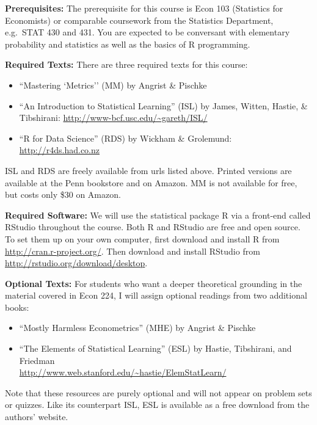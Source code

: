 \documentclass[11pt, letterpaper]{article}
\begin{document}
\medskip

\noindent \textbf{Prerequisites:} 
The prerequisite for this course is Econ 103 (Statistics for Economists) or comparable coursework from the Statistics Department, e.g.\ STAT 430 and 431. 
You are expected to be conversant with elementary probability and statistics as well as the basics of R programming.




\medskip

\noindent \textbf{Required Texts:} There are three required texts for this course:
\begin{itemize}
  \item ``Mastering `Metrics'' (MM) by Angrist \& Pischke
  \item ``An Introduction to Statistical Learning'' (ISL) by James, Witten, Hastie, \& Tibshirani: \url{http://www-bcf.usc.edu/~gareth/ISL/}
  \item ``R for Data Science'' (RDS) by Wickham \& Grolemund: \url{http://r4ds.had.co.nz}
\end{itemize}
ISL and RDS are freely available from urls listed above.
Printed versions are available at the Penn bookstore and on Amazon.
MM is not available for free, but costs only \$30 on Amazon.

\medskip


\noindent \textbf{Required Software:} 
We will use the statistical package R via a front-end called RStudio throughout the course. 
Both R and RStudio are free and open source. 
To set them up on your own computer, first download and install R from \url{http://cran.r-project.org/}. 
Then download and install RStudio from \url{http://rstudio.org/download/desktop}.


\medskip

\noindent \textbf{Optional Texts:}
For students who want a deeper theoretical grounding in the material covered in Econ 224, I will assign optional readings from two additional books:
\begin{itemize}
  \item ``Mostly Harmless Econometrics'' (MHE) by Angrist \& Pischke
  \item ``The Elements of Statistical Learning'' (ESL) by Hastie, Tibshirani, and Friedman \\\url{http://www.web.stanford.edu/~hastie/ElemStatLearn/}
\end{itemize}
Note that these resources are purely optional and will not appear on problem sets or quizzes.
Like its counterpart ISL, ESL is available as a free download from the authors' website.
\end{document}
